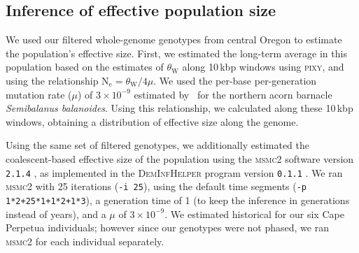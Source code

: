 \subsection*{Inference of effective population size}

We used our filtered whole-genome genotypes from central Oregon \bgla{} to estimate the
population's effective size.
First, we estimated the long-term average \Ne{} in this population based on the
estimates of $\theta_\text{W}$ along 10\,kbp windows using \textsc{pixy}, and using the
relationship $\text{N}_\text{e} = \theta_\text{W}/4\mu$.
We used the per-base per-generation mutation rate ($\mu$) of $3\times10^{-9}$ estimated
by~\citet{nunez_footprints_2020} for the northern acorn barnacle
\textit{Semibalanus balanoides}.
Using this relationship, we calculated \Ne{} along these 10\,kbp windows, obtaining a
distribution of effective size along the genome.
\vspace{0.1cm}

Using the same set of filtered genotypes, we additionally estimated the coalescent-based
effective size of the population using the \textsc{msmc2} software version \texttt{2.1.4}
\citep{dutheil_msmc_2020}, as implemented in the \textsc{DemInfHelper} program version
\texttt{0.1.1} \citep{forest_popsize_2024}.
We ran \textsc{msmc2} with 25 iterations (\texttt{-i 25}), using the default
time segments (\texttt{-p 1*2+25*1+1*2+1*3}), a generation time of 1 (to keep the inference
in generations instead of years), and a $\mu$ of $3\times10^{-9}$.
We estimated historical \Ne{} for our six Cape Perpetua individuals; however since
our genotypes were not phased, we ran \textsc{msmc2} for each individual separately.
